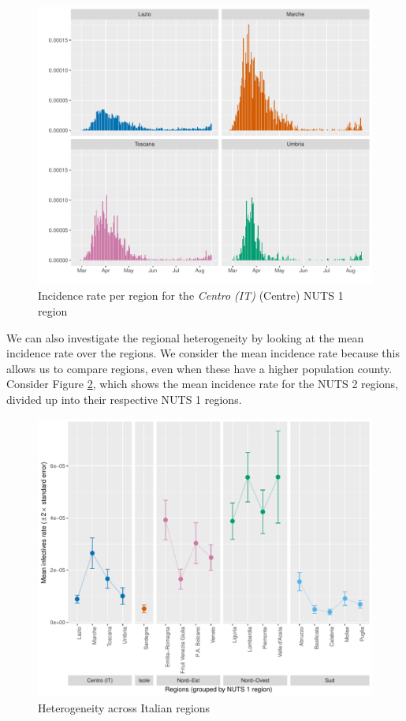 \documentclass[12pt]{article}
\begin{document}
	\begin{figure}[H]
	    \centering
	    \includegraphics[width=\textwidth]{output/infective_rates_Centro (IT).pdf}
	    \caption{Incidence rate per region for the \textit{Centro (IT)} (Centre) NUTS 1 region}
	    \label{fig:incidence_Centro}
	\end{figure}
	
	We can also investigate the regional heterogeneity by looking at the mean incidence rate over the regions. We consider the mean incidence rate because this allows us to compare regions, even when these have a higher population county. Consider Figure \ref{fig:heterogeneity_over_regions}, which shows the mean incidence rate for the NUTS 2 regions, divided up into their respective NUTS 1 regions. \\
	
	\begin{figure}[ht]
	    \centering
	    \includegraphics[width=\textwidth]{output/heterogeneity_over_regions.pdf}
	    \caption{Heterogeneity across Italian regions}
	    \label{fig:heterogeneity_over_regions}
	\end{figure}
	
\end{document}
